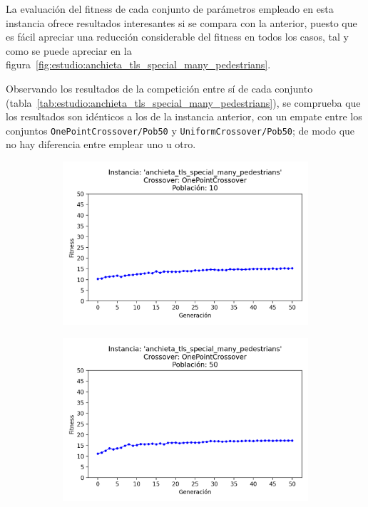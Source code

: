 La evaluación del fitness de cada conjunto de parámetros empleado en esta instancia ofrece resultados interesantes si se compara con la anterior, puesto que es fácil apreciar una reducción considerable del fitness en todos los casos, tal y como se puede apreciar en la figura~\ref{fig:estudio:anchieta_tls_special_many_pedestrians}.  

Observando los resultados de la competición entre sí de cada conjunto (tabla~\ref{tab:estudio:anchieta_tls_special_many_pedestrians}), se comprueba que los resultados son idénticos a los de la instancia anterior, con un empate entre los conjuntos \texttt{OnePointCrossover/Pob50} y \texttt{UniformCrossover/Pob50}; de modo que no hay diferencia entre emplear uno u otro.

\begin{figure}[h]
    \centering
    \begin{subfigure}[t]{.49\textwidth}
      \centering
      \includegraphics[width=\textwidth]{report/images/estudio/anchieta_tls_special_many_pedestrians-OnePointCrossover-10.png}
    \end{subfigure}
    \hfill
    \begin{subfigure}[t]{.49\textwidth}
      \centering
      \includegraphics[width=\textwidth]{report/images/estudio/anchieta_tls_special_many_pedestrians-OnePointCrossover-50.png}

\end{subfigure}
\end{figure}
